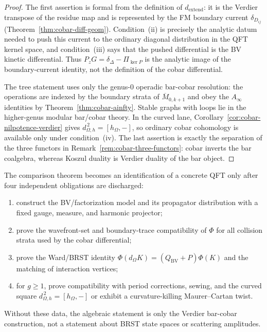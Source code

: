 \begin{proof}
The first assertion is formal from the definition of
$d_{\mathrm{extend}}$: it is the Verdier transpose of the residue map
and is represented by the FM boundary current $\delta_{D_{ij}}$
(Theorem~\ref{thm:cobar-diff-geom}). Condition~(ii) is precisely the
analytic datum needed to push this current to the ordinary diagonal
distribution in the QFT kernel space, and condition~(iii) says that
the pushed differential is the BV kinetic differential. Thus
$P_zG=\delta_\Delta-\Pi_{\ker P}$ is the analytic image of the
boundary-current identity, not the definition of the cobar
differential.

The tree statement uses only the genus-$0$ operadic bar-cobar
resolution: the operations are indexed by the boundary strata of
$\overline{M}_{0,k+1}$ and obey the $A_\infty$ identities by
Theorem~\ref{thm:cobar-ainfty}. Stable graphs with loops lie in the
higher-genus modular bar/cobar theory. In the curved lane,
Corollary~\ref{cor:cobar-nilpotence-verdier} gives
$d_{\Omega,h}^{\,2}=[h_\Omega,-]$, so ordinary cobar cohomology is
available only under condition~(iv). The last assertion is exactly the
separation of the three functors in
Remark~\ref{rem:cobar-three-functors}: cobar inverts the bar coalgebra,
whereas Koszul duality is Verdier duality of the bar object.
\end{proof}

\begin{remark}
The comparison theorem becomes an identification of a concrete QFT only
after four independent obligations are discharged:
\begin{enumerate}[label=\textup{(\alph*)}]
\item construct the BV/factorization model and its propagator
distribution with a fixed gauge, measure, and harmonic projector;
\item prove the wavefront-set and boundary-trace compatibility of
$\Phi$ for all collision strata used by the cobar differential;
\item prove the Ward/BRST identity
$\Phi(d_\Omega K)=(Q_{\mathrm{BV}}+P)\Phi(K)$ and the matching of
interaction vertices;
\item for $g\geq1$, prove compatibility with period corrections,
sewing, and the curved square
$d_{\Omega,h}^{\,2}=[h_\Omega,-]$ or exhibit a curvature-killing
Maurer--Cartan twist.
\end{enumerate}
Without these data, the algebraic statement is only the Verdier
bar-cobar construction, not a statement about BRST state spaces or
scattering amplitudes.
\end{remark}

